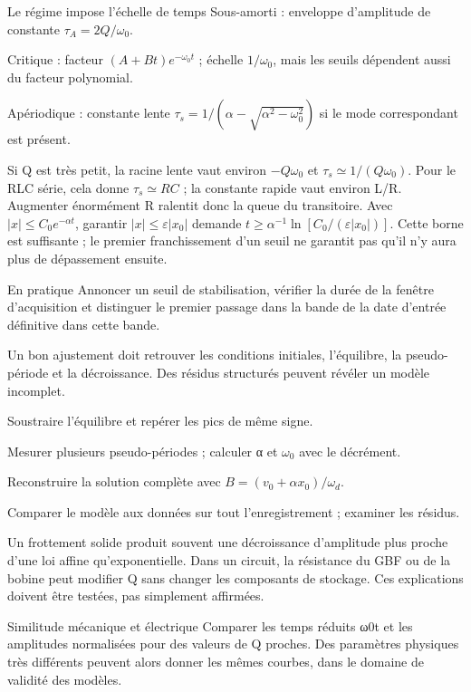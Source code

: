 \begin{loi}{Le régime impose l’échelle de temps}
Sous-amorti : enveloppe d’amplitude de constante $\tau_A=2Q/\omega_0$.\par Critique : facteur $(A+Bt)e^{-\omega_0t}$ ; échelle $1/\omega_0$, mais les seuils dépendent aussi du facteur polynomial.\par Apériodique : constante lente $\tau_s=1/(\alpha-\sqrt{\alpha^2-\omega_0^2})$ si le mode correspondant est présent.
\end{loi}
Si Q est très petit, la racine lente vaut environ $-Q\omega_0$ et $\tau_s\simeq1/(Q\omega_0)$. Pour le RLC série, cela donne $\tau_s\simeq RC$ ; la constante rapide vaut environ L/R. Augmenter énormément R ralentit donc la queue du transitoire.
Avec $|x|\leq C_0e^{-\alpha t}$, garantir $|x|\leq\varepsilon|x_0|$ demande $t\geq\alpha^{-1}\ln[C_0/(\varepsilon|x_0|)]$. Cette borne est suffisante ; le premier franchissement d’un seuil ne garantit pas qu’il n’y aura plus de dépassement ensuite.
\begin{methode}{En pratique}
Annoncer un seuil de stabilisation, vérifier la durée de la fenêtre d’acquisition et distinguer le premier passage dans la bande de la date d’entrée définitive dans cette bande.
\end{methode}


Un bon ajustement doit retrouver les conditions initiales, l’équilibre, la pseudo-période et la décroissance. Des résidus structurés peuvent révéler un modèle incomplet.
\begin{questions}
\item Soustraire l’équilibre et repérer les pics de même signe.
\item Mesurer plusieurs pseudo-périodes ; calculer α et $\omega_0$ avec le décrément.
\item Reconstruire la solution complète avec $B=(v_0+\alpha x_0)/\omega_d$.
\item Comparer le modèle aux données sur tout l’enregistrement ; examiner les résidus.
\end{questions}

Un frottement solide produit souvent une décroissance d’amplitude plus proche d’une loi affine qu’exponentielle. Dans un circuit, la résistance du GBF ou de la bobine peut modifier Q sans changer les composants de stockage. Ces explications doivent être testées, pas simplement affirmées.
\begin{methode}{Similitude mécanique et électrique}
Comparer les temps réduits ω0t et les amplitudes normalisées pour des valeurs de Q proches. Des paramètres physiques très différents peuvent alors donner les mêmes courbes, dans le domaine de validité des modèles.
\end{methode}


